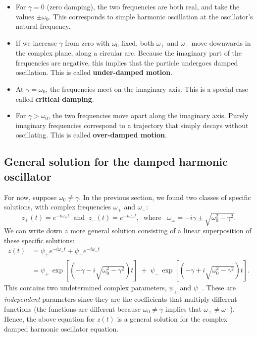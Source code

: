 \documentclass[10pt,a4paper]{article}
\begin{document}
\begin{itemize}
\item
  For $\gamma = 0$ (zero damping), the two frequencies are both real,
  and take the values $\pm \omega_0$. This corresponds to simple
  harmonic oscillation at the oscillator's natural frequency.
\item
  If we increase $\gamma$ from zero with $\omega_0$ fixed, both
  $\omega_+$ and $\omega_-$ move downwards in the complex plane,
  along a circular arc. Because the imaginary part of the frequencies
  are negative, this implies that the particle undergoes damped
  oscillation. This is called \textbf{under-damped motion}.

\item
  At $\gamma = \omega_0$, the frequencies meet on the imaginary
  axis. This is a special case called \textbf{critical damping}.

\item
  For $\gamma > \omega_0$, the two frequencies move apart along the
  imaginary axis. Purely imaginary frequencies correspond to a
  trajectory that simply decays without oscillating. This is called
  \textbf{over-damped motion}.
\end{itemize}

\subsection{General solution for the damped harmonic oscillator}
\label{general-solution-for-the-damped-harmonic-oscillator}

For now, suppose $\omega_0 \ne \gamma$. In the previous section, we
found two classes of specific solutions, with complex frequencies
$\omega_+$ and $\omega_-$:
\begin{equation}
z_+(t) = e^{-i\omega_+ t} \;\;\mathrm{and}\;\; z_-(t) = e^{-i\omega_- t}, \;\;\mathrm{where}\;\;\; \omega_\pm = -i\gamma \pm \sqrt{\omega_0^2 - \gamma^2}.
\end{equation}
We can write down a more general solution consisting of a linear
superposition of these specific solutions:
\begin{align}
  z(t) &= \psi_+ e^{-i\omega_+ t} + \psi_- e^{-i\omega_- t}
  \label{gensol} \\
  &= \psi_+ \, \exp\left[\left(-\gamma  - i \sqrt{\omega_0^2 - \gamma^2}\right)t\right] \; +\; \psi_- \, \exp\left[\left(-\gamma +i\sqrt{\omega_0^2 - \gamma^2}\right)t\right].
\end{align}
This contains two undetermined complex parameters, $\psi_+$ and
$\psi_-$. These are \emph{independent} parameters since they are the
coefficients that multiply different functions (the functions are
different because $\omega_0 \ne \gamma$ implies that
$\omega_+ \ne \omega_-$). Hence, the above equation for $z(t)$ is a
general solution for the complex damped harmonic oscillator equation.
\end{document}
